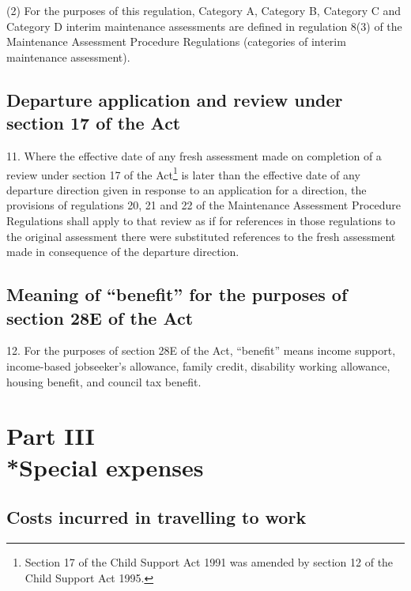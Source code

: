 \documentclass[a4paper]{article}
\newcommand{\parthead}{}
\begin{document}
(2) For the purposes of this regulation, Category A, Category B, Category C and
Category D interim maintenance assessments are defined in regulation 8(3) of the
Maintenance Assessment Procedure Regulations (categories of interim maintenance
assessment).

\subsection[11. Departure application and review under section 17 of the Act]{Departure application and review under section 17 of the Act}

11. Where the
effective date of any fresh assessment made on completion of a review under
section 17 of the Act\footnote{\frenchspacing Section 17 of the Child Support Act 1991 was amended by section 12 of the Child Support Act 1995.} is later than the effective date of any departure
direction given in response to an application for a direction, the provisions of
regulations 20, 21 and 22 of the Maintenance Assessment Procedure Regulations
shall apply to that review as if for references in those regulations to the
original assessment there were substituted references to the fresh assessment
made in consequence of the departure direction.

\subsection[12. Meaning of “benefit” for the purposes of section 28E of the Act]{Meaning of “benefit” for the purposes of section 28E of the Act}

12. For the
purposes of section 28E of the Act, “benefit” means income support, income-based
jobseeker’s allowance, family credit, disability working allowance, housing
benefit, and council tax benefit.

\section[Part III --- Special expenses]{Part III\\*Special expenses}

\renewcommand\parthead{--- Part III}

\subsection[13. Costs incurred in travelling to work]{Costs incurred in travelling to work}
\end{document}
